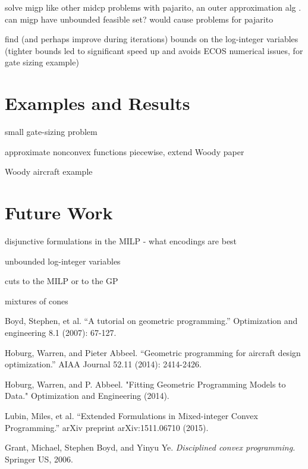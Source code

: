 \documentclass[]{article}
\begin{document}
solve migp like other midcp problems with pajarito, an outer approximation alg \cite{lubin15}. can migp have unbounded feasible set? would cause problems for pajarito

find (and perhaps improve during iterations) bounds on the log-integer variables (tighter bounds led to significant speed up and avoids ECOS numerical issues, for gate sizing example)



\section{Examples and Results}

small gate-sizing problem



approximate nonconvex functions piecewise, extend Woody paper \cite{hoburg14b}

Woody aircraft example



\section{Future Work}

disjunctive formulations in the MILP - what encodings are best

unbounded log-integer variables

cuts to the MILP or to the GP

mixtures of cones













\begin{thebibliography}{9}

Boyd, Stephen, et al. ``A tutorial on geometric programming.'' Optimization and engineering 8.1 (2007): 67-127.

Hoburg, Warren, and Pieter Abbeel. ``Geometric programming for aircraft design optimization.'' AIAA Journal 52.11 (2014): 2414-2426.

Hoburg, Warren, and P. Abbeel. "Fitting Geometric Programming Models to Data." Optimization and Engineering (2014).

Lubin, Miles, et al. ``Extended Formulations in Mixed-integer Convex Programming.'' arXiv preprint arXiv:1511.06710 (2015).

Grant, Michael, Stephen Boyd, and Yinyu Ye. \textit{Disciplined convex programming.} Springer US, 2006.

\end{thebibliography}
\end{document}
